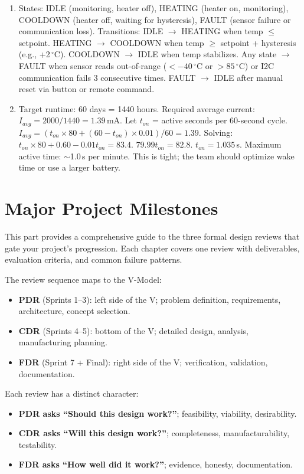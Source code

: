 \documentclass[11pt,letterpaper,twoside,openany]{book}
\newcommand{\degC}{\ensuremath{{}^{\circ}\text{C}}}
\begin{document}
\begin{enumerate}[leftmargin=1.5em]
\item States: IDLE (monitoring, heater off), HEATING (heater on, monitoring), COOLDOWN (heater off, waiting for hysteresis), FAULT (sensor failure or communication loss). Transitions: IDLE $\to$ HEATING when temp $\leq$ setpoint. HEATING $\to$ COOLDOWN when temp $\geq$ setpoint + hysteresis (e.g., +2\,\degC{}). COOLDOWN $\to$ IDLE when temp stabilizes. Any state $\to$ FAULT when sensor reads out-of-range ($<-40$\,\degC{} or $>85$\,\degC{}) or I2C communication fails 3 consecutive times. FAULT $\to$ IDLE after manual reset via button or remote command.
\item Target runtime: 60 days = 1440 hours. Required average current: $I_{avg} = 2000/1440 = 1.39$\,mA. Let $t_{on}$ = active seconds per 60-second cycle. $I_{avg} = (t_{on} \times 80 + (60 - t_{on}) \times 0.01)/60 = 1.39$. Solving: $t_{on} \times 80 + 0.60 - 0.01 t_{on} = 83.4$. $79.99 t_{on} = 82.8$. $t_{on} = 1.035$\,s. Maximum active time: $\sim$1.0\,s per minute. This is tight; the team should optimize wake time or use a larger battery.
\end{enumerate}



\part{Major Project Milestones}

This part provides a comprehensive guide to the three formal design reviews that gate your project's progression. Each chapter covers one review with deliverables, evaluation criteria, and common failure patterns.


The review sequence maps to the V-Model:
\begin{itemize}[nosep,leftmargin=1.5em]
\item \textbf{PDR} (Sprints 1--3): left side of the V; problem definition, requirements, architecture, concept selection.
\item \textbf{CDR} (Sprints 4--5): bottom of the V; detailed design, analysis, manufacturing planning.
\item \textbf{FDR} (Sprint 7 + Final): right side of the V; verification, validation, documentation.
\end{itemize}

Each review has a distinct character:
\begin{itemize}[nosep,leftmargin=1.5em]
\item \textbf{PDR asks ``Should this design work?''}; feasibility, viability, desirability.
\item \textbf{CDR asks ``Will this design work?''}; completeness, manufacturability, testability.
\item \textbf{FDR asks ``How well did it work?''}; evidence, honesty, documentation.
\end{itemize}
\end{document}
